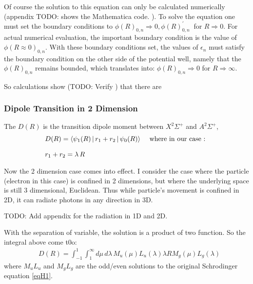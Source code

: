 Of course the solution to this equation can only be calculated numerically (appendix TODO: shows the Mathematica code. ).  To solve the equation one must set the boundary conditions to  $ \phi(R)_{0,n} \Rightarrow 0, \phi(R)^{'}_{0,n} \ $ for $ R \Rightarrow 0 $. For actual numerical evaluation, the important boundary condition is the value of  $ \phi(R \approx 0 )_{0,n} $.  With these boundary conditions set, the values of $ \epsilon_n $ must satisfy the boundary condition on the other side of the potential well, namely  that the $ \phi(R)_{0,n} $ remains bounded, which translates into: $ \phi(R)_{0,n} \Rightarrow 0 $ for $ R \Rightarrow \infty $. 

So calculations show (TODO: Verify ) that there are 

\subsubsection{Dipole Transition in 2 Dimension}

The $ D(R) $ is the transition dipole moment  between $ X^2\Sigma^{+} $  and $ A^2\Sigma^{+} $, \begin{equation}
\begin{split}
& D(R) = \Braket{\psi_1(R) | r_1 +  r_2 | \psi_0(R) } \,\,\,\,\,\text{ where in our case : } \\[.8em]
& r_1 + r_2 = \lambda\, R
\end{split}
\end{equation}

Now the 2 dimension case comes into effect. I consider the case where the particle (electron in this case) is confined in 2 dimensions, but where the underlying space is still 3 dimensional, Euclidean. Thus while particle's movement is confined in 2D, it can radiate photons in any direction in 3D.

TODO: Add appendix for the radiation in 1D and 2D.

With the separation of variable, the solution is a product of two function. So the integral above come t0o:
\begin{equation}\label{Dint1}
\begin{split}
& D(R) = \int_{-1}^{1}{\int_{1}^{\infty}{ d\mu\, d\lambda\, M_u(\mu)L_u(\lambda)\lambda R M_g(\mu)L_g(\lambda) }}
\end{split}
\end{equation}
where $ M_uL_u $ and $ M_gL_g $ are the odd/even solutions to the original Schrodinger equation \eqref{eqH1}.

